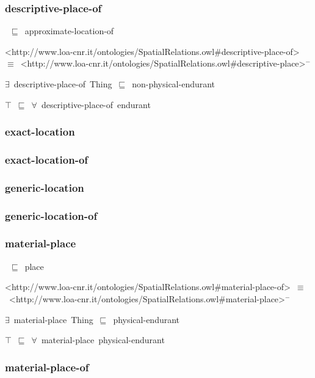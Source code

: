 \documentclass{article}
\begin{document}
\subsubsection*{descriptive-place-of}

~\ensuremath{\sqsubseteq}~approximate-location-of

<http://www.loa-cnr.it/ontologies/SpatialRelations.owl#descriptive-place-of>~\ensuremath{\equiv}~<http://www.loa-cnr.it/ontologies/SpatialRelations.owl#descriptive-place>\ensuremath{^-}

\ensuremath{\exists}~descriptive-place-of~Thing~\ensuremath{\sqsubseteq}~non-physical-endurant

\ensuremath{\top}~\ensuremath{\sqsubseteq}~\ensuremath{\forall}~descriptive-place-of~endurant

\subsubsection*{exact-location}

\subsubsection*{exact-location-of}

\subsubsection*{generic-location}

\subsubsection*{generic-location-of}

\subsubsection*{material-place}

~\ensuremath{\sqsubseteq}~place

<http://www.loa-cnr.it/ontologies/SpatialRelations.owl#material-place-of>~\ensuremath{\equiv}~<http://www.loa-cnr.it/ontologies/SpatialRelations.owl#material-place>\ensuremath{^-}

\ensuremath{\exists}~material-place~Thing~\ensuremath{\sqsubseteq}~physical-endurant

\ensuremath{\top}~\ensuremath{\sqsubseteq}~\ensuremath{\forall}~material-place~physical-endurant

\subsubsection*{material-place-of}
\end{document}
